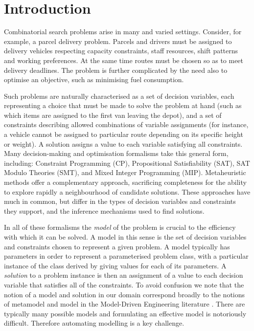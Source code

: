 \documentclass[runningheads]{llncs}
\begin{document}

\section{Introduction}

Combinatorial search problems arise in many and varied settings. Consider, for example, a parcel delivery problem. Parcels and drivers must be assigned to delivery vehicles respecting capacity constraints, staff resources, shift patterns and working preferences. At the same time routes must be chosen so as to meet delivery deadlines. The problem is further complicated by the need also to optimise an objective, such as minimising fuel consumption.

Such problems are naturally characterised as a set of decision variables, each representing a choice that must be made to solve the problem at hand (such as which items are assigned to the first van leaving the depot), and a set of constraints describing allowed combinations of variable assignments (for instance, a vehicle cannot be assigned to particular route depending on its specific height or weight). A solution assigns a value to each variable satisfying all constraints. Many decision-making and optimisation formalisms take this general form, including: Constraint Programming (CP), Propositional Satisfiability (SAT), SAT Modulo Theories (SMT), and Mixed Integer Programming (MIP). Metaheuristic methods offer a complementary approach, sacrificing completeness for the ability to explore rapidly a neighbourhood of candidate solutions. These approaches have much in common, but differ in the types of decision variables and constraints they support, and the inference mechanisms used to find solutions.

In all of these formalisms the {\em model} of the problem is crucial to the efficiency with which it can be solved. A model in this sense is the set of decision variables and constraints chosen to represent a given problem. A model typically has parameters in order to represent a parameterised problem class, with a particular instance of the class derived by giving values for each of its parameters. A {\em solution} to a problem instance is then an assignment of a value to each decision variable that satisfies all of the constraints. To avoid confusion we note that the notion of a model and solution in our domain correspond broadly to the notions of metamodel and model in the Model-Driven Engineering literature \cite{wachsmuth2007metamodel}. There are typically many possible models and formulating an effective model is notoriously difficult. Therefore automating modelling is a key challenge. 
\end{document}
